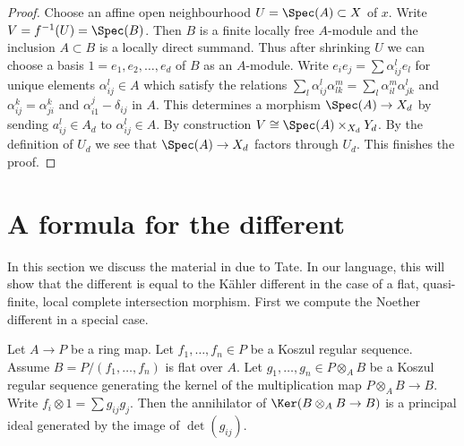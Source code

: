 \begin{proof}
Choose an affine open neighbourhood $U = \Spec(A) \subset X$ of $x$.
Write $V = f^{-1}(U) = \Spec(B)$. Then $B$ is a finite locally free
$A$-module and the inclusion $A \subset B$ is a locally direct summand.
Thus after shrinking $U$ we can choose a basis $1 = e_1, e_2, \ldots, e_d$
of $B$ as an $A$-module. Write
$e_i e_j = \sum \alpha_{ij}^l e_l$ for unique
elements $\alpha_{ij}^l \in A$ which satisfy the relations
$\sum_l \alpha_{ij}^l \alpha_{lk}^m = \sum_l \alpha_{il}^m \alpha _{jk}^l$
and $\alpha_{ij}^k = \alpha_{ji}^k$ and $\alpha_{i1}^j - \delta_{ij}$
in $A$. This determines a morphism $\Spec(A) \to X_d$ by sending
$a_{ij}^l \in A_d$ to $\alpha_{ij}^l \in A$. By construction
$V \cong \Spec(A) \times_{X_d} Y_d$. By the definition of $U_d$
we see that $\Spec(A) \to X_d$ factors through $U_d$. This
finishes the proof.
\end{proof}










\section{A formula for the different}
\label{section-formula-different}

\noindent
In this section we discuss the material in \cite[Appendix A]{Mazur-Roberts}
due to Tate. In our language, this will show that the different is
equal to the K\"ahler different in the case of a flat, quasi-finite,
local complete intersection morphism.
First we compute the Noether different in a special case.

\begin{lemma}
\label{lemma-tate}
\begin{reference}
\cite[Appendix]{Mazur-Roberts}
\end{reference}
Let $A \to P$ be a ring map. Let $f_1, \ldots, f_n \in P$ be a
Koszul regular sequence. Assume $B = P/(f_1, \ldots, f_n)$
is flat over $A$. Let $g_1, \ldots, g_n \in P \otimes_A B$
be a Koszul regular sequence generating the kernel of the multiplication
map $P \otimes_A B \to B$. Write $f_i \otimes 1 = \sum g_{ij} g_j$.
Then the annihilator of $\Ker(B \otimes_A B \to B)$ is a principal
ideal generated by the image of $\det(g_{ij})$.
\end{lemma}

